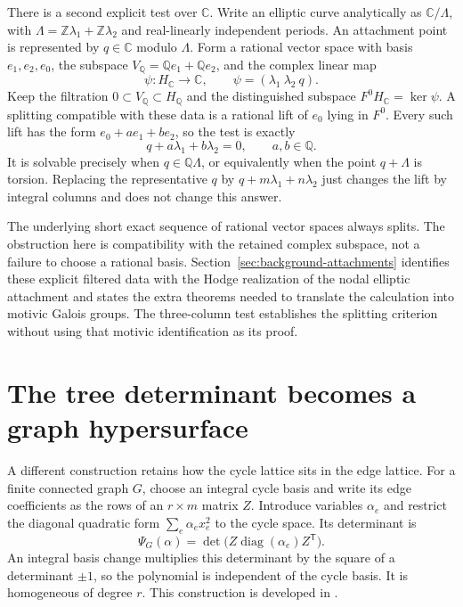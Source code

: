 \documentclass[11pt]{article}
\theoremstyle{definition}
\theoremstyle{remark}
\newcommand{\Q}{\mathbb Q}
\newcommand{\Z}{\mathbb Z}
\newcommand{\C}{\mathbb C}
\begin{document}
There is a second explicit test over $\C$. Write an elliptic curve analytically as $\C/\Lambda$, with $\Lambda=\Z\lambda_1+\Z\lambda_2$ and real-linearly independent periods. An attachment point is represented by $q\in\C$ modulo $\Lambda$. Form a rational vector space with basis $e_1,e_2,e_0$, the subspace $V_\Q=\Q e_1+\Q e_2$, and the complex linear map
\[
 \psi:H_\C\longrightarrow\C,
 \qquad \psi=(\lambda_1\ \lambda_2\ q).
\]
Keep the filtration $0\subset V_\Q\subset H_\Q$ and the distinguished subspace $F^0H_\C=\ker\psi$. A splitting compatible with these data is a rational lift of $e_0$ lying in $F^0$. Every such lift has the form $e_0+a e_1+b e_2$, so the test is exactly
\[
 q+a\lambda_1+b\lambda_2=0,\qquad a,b\in\Q.
\]
It is solvable precisely when $q\in\Q\Lambda$, or equivalently when the point $q+\Lambda$ is torsion. Replacing the representative $q$ by $q+m\lambda_1+n\lambda_2$ just changes the lift by integral columns and does not change this answer.

The underlying short exact sequence of rational vector spaces always splits. The obstruction here is compatibility with the retained complex subspace, not a failure to choose a rational basis. Section~\ref{sec:background-attachments} identifies these explicit filtered data with the Hodge realization of the nodal elliptic attachment and states the extra theorems needed to translate the calculation into motivic Galois groups. The three-column test establishes the splitting criterion without using that motivic identification as its proof.

\section{The tree determinant becomes a graph hypersurface}
\label{sec:graph-hypersurface}

A different construction retains how the cycle lattice sits in the edge
lattice.  For a finite connected graph $G$, choose an integral cycle
basis and write its edge coefficients as the rows of an $r\times m$
matrix $Z$.  Introduce variables $\alpha_e$ and restrict the diagonal
quadratic form $\sum_e\alpha_e x_e^2$ to the cycle space.  Its determinant
is
\[
  \Psi_G(\alpha)=\det\bigl(Z\operatorname{diag}(\alpha_e)Z^{\mathsf T}\bigr).
\]
An integral basis change multiplies this determinant by the square of a
determinant $\pm1$, so the polynomial is independent of the cycle basis.
It is homogeneous of degree $r$.  This construction is developed in
\cite[\S1--2]{BEKGraphPolynomials}.
\end{document}
